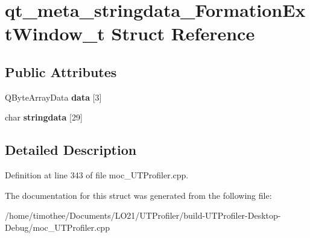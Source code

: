 \hypertarget{structqt__meta__stringdata___formation_ext_window__t}{\section{qt\-\_\-meta\-\_\-stringdata\-\_\-\-Formation\-Ext\-Window\-\_\-t Struct Reference}
\label{structqt__meta__stringdata___formation_ext_window__t}
}
\subsection*{Public Attributes}
\begin{DoxyCompactItemize}
\item 
\hypertarget{structqt__meta__stringdata___formation_ext_window__t_a0b77957c957a98850a2f9ad9d1cee1ab}{Q\-Byte\-Array\-Data {\bfseries data} \mbox{[}3\mbox{]}}\label{structqt__meta__stringdata___formation_ext_window__t_a0b77957c957a98850a2f9ad9d1cee1ab}

\item 
\hypertarget{structqt__meta__stringdata___formation_ext_window__t_ad90fbbe95508e5217246237f1d0d81c9}{char {\bfseries stringdata} \mbox{[}29\mbox{]}}\label{structqt__meta__stringdata___formation_ext_window__t_ad90fbbe95508e5217246237f1d0d81c9}

\end{DoxyCompactItemize}


\subsection{Detailed Description}


Definition at line 343 of file moc\-\_\-\-U\-T\-Profiler.\-cpp.



The documentation for this struct was generated from the following file\-:\begin{DoxyCompactItemize}
\item 
/home/timothee/\-Documents/\-L\-O21/\-U\-T\-Profiler/build-\/\-U\-T\-Profiler-\/\-Desktop-\/\-Debug/moc\-\_\-\-U\-T\-Profiler.\-cpp\end{DoxyCompactItemize}
